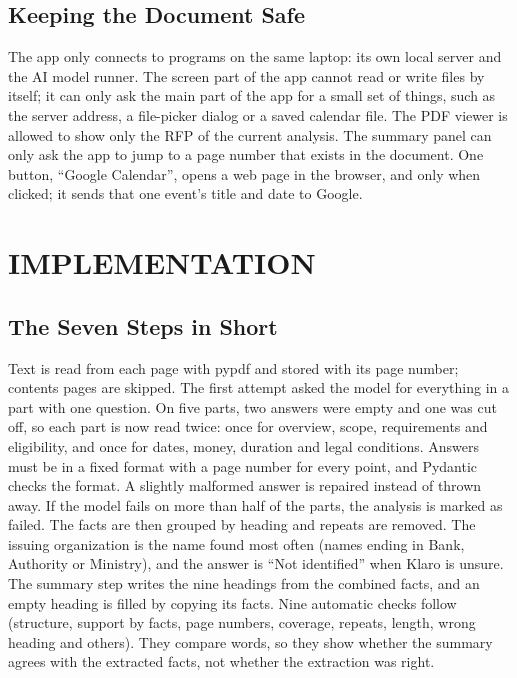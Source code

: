 \documentclass[11pt,a4paper,oneside]{report}
\newcommand{\nonum}{}%
\begin{document}
\section{Keeping the Document Safe}
The app only connects to programs on the same laptop: its own local server and the AI model runner.
The screen part of the app cannot read or write files by itself; it can only ask the main part of the
app for a small set of things, such as the server address, a file-picker dialog or a saved calendar
file. The PDF viewer is allowed to show only the RFP of the current analysis. The summary panel can
only ask the app to jump to a page number that exists in the document. One button, ``Google
Calendar'', opens a web page in the browser, and only when clicked; it sends that one event's title
and date to Google.

\chapter{IMPLEMENTATION}\nonum

\section{The Seven Steps in Short}
Text is read from each page with pypdf and stored with its page number; contents pages are skipped.
The first attempt asked the model for everything in a part with one question. On five parts, two
answers were empty and one was cut off, so each part is now read twice: once for overview, scope,
requirements and eligibility, and once for dates, money, duration and legal conditions. Answers must
be in a fixed format with a page number for every point, and Pydantic checks the format. A slightly
malformed answer is repaired instead of thrown away. If the model fails on more than half of the
parts, the analysis is marked as failed. The facts are then grouped by heading and repeats are
removed. The issuing organization is the name found most often (names ending in Bank, Authority or
Ministry), and the answer is ``Not identified'' when Klaro is unsure. The summary step writes the nine
headings from the combined facts, and an empty heading is filled by copying its facts. Nine automatic
checks follow (structure, support by facts, page numbers, coverage, repeats, length, wrong heading
and others). They compare words, so they show whether the summary agrees with the extracted facts,
not whether the extraction was right.
\end{document}
